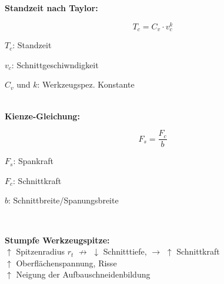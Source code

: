 \textbf{Standzeit nach Taylor:}\\
\begin{minipage}{0.5\linewidth}
    \[
    \boxed{     
        T_c = C_v \cdot v_c^k
    }
    \]
\end{minipage}
\begin{minipage}{0.5\linewidth}
    \begin{tiny}
    \item $T_c$: Standzeit
    \item $v_c$: Schnittgeschiwndigkeit
    \item $C_v$ und $k$: Werkzeugspez. Konstante
    \end{tiny}
\end{minipage}\\
\vspace{1mm}
\textbf{Kienze-Gleichung:}\\
\begin{minipage}{0.5\linewidth}
    \[
    \boxed{     
        F_s = \frac{F_c}{b}
    }
    \]
\end{minipage}
\begin{minipage}{0.5\linewidth}
    \begin{tiny}
    \item $F_s$: Spankraft
    \item $F_c$: Schnittkraft
    \item $b$: Schnittbreite/Spanungsbreite
    \end{tiny}
\end{minipage}\\
\vspace{1mm}

\textbf{Stumpfe Werkzeugspitze: }\\
$\uparrow$ Spitzenradius $r_t$ $\not\rightarrow$ $\downarrow$ Schnitttiefe, $\rightarrow$ $\uparrow$ Schnittkraft\\
$\uparrow$ Oberflächenspannung, Risse\\
$\uparrow$ Neigung der Aufbauschneidenbildung


